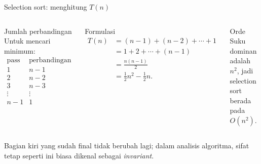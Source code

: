 \documentclass[aspectratio=169,11pt]{beamer}
\begin{document}
\begin{frame}{Selection sort: menghitung $T(n)$}
\begin{columns}[T]
\begin{block}{Jumlah perbandingan}
Untuk mencari minimum:
\[
\begin{array}{c|c}
\text{pass} & \text{perbandingan}\\\hline
1 & n-1\\
2 & n-2\\
3 & n-3\\
\vdots & \vdots\\
n-1 & 1
\end{array}
\]
\end{block}
\begin{block}{Formulasi}
\[
\begin{aligned}
T(n)&=(n-1)+(n-2)+\cdots+1\\
&=1+2+\cdots+(n-1)\\
&=\frac{n(n-1)}{2}\\
&=\frac12 n^2-\frac12 n.
\end{aligned}
\]
\end{block}
\pause
\begin{alertblock}{Orde}
Suku dominan adalah $n^2$, jadi selection sort berada pada $O(n^2)$.
\end{alertblock}
\end{columns}
\vspace{1mm}
\small Bagian kiri yang sudah final tidak berubah lagi; dalam analisis algoritma, sifat tetap seperti ini biasa dikenal sebagai \textit{invariant}.
\end{frame}
\end{document}
